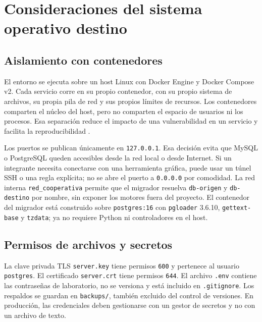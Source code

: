 
\section{Consideraciones del sistema operativo destino}

\subsection{Aislamiento con contenedores}

El entorno se ejecuta sobre un host Linux con Docker Engine y Docker Compose
v2. Cada servicio corre en su propio contenedor, con su propio sistema de
archivos, su propia pila de red y sus propios límites de recursos. Los
contenedores comparten el núcleo del host, pero no comparten el espacio de
usuarios ni los procesos. Esa separación reduce el impacto de una
vulnerabilidad en un servicio y facilita la reproducibilidad
\citep{docker2024}.

Los puertos se publican únicamente en \texttt{127.0.0.1}. Esa decisión evita
que MySQL o PostgreSQL queden accesibles desde la red local o desde Internet.
Si un integrante necesita conectarse con una herramienta gráfica, puede usar
un túnel SSH o una regla explícita; no se abre el puerto a \texttt{0.0.0.0}
por comodidad. La red interna \texttt{red\_cooperativa} permite que el
migrador resuelva \texttt{db-origen} y \texttt{db-destino} por nombre, sin
exponer los motores fuera del proyecto. El contenedor del migrador está
construido sobre \texttt{postgres:16} con \texttt{pgloader} 3.6.10,
\texttt{gettext-base} y \texttt{tzdata}; ya no requiere Python ni controladores
en el host.

\subsection{Permisos de archivos y secretos}

La clave privada TLS \texttt{server.key} tiene permisos \texttt{600} y
pertenece al usuario \texttt{postgres}. El certificado \texttt{server.crt}
tiene permisos \texttt{644}. El archivo \texttt{.env} contiene las
contraseñas de laboratorio, no se versiona y está incluido en
\texttt{.gitignore}. Los respaldos se guardan en \texttt{backups/}, también
excluido del control de versiones. En producción, las credenciales deben
gestionarse con un gestor de secretos y no con un archivo de texto.

